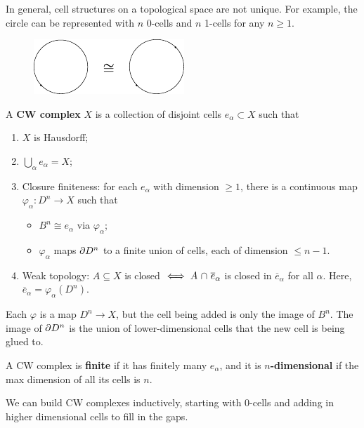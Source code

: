 \documentclass[twoside,10pt]{report}
\begin{document}
In general, cell structures on a topological space are not unique. For example, the circle can be represented with $n$ 0-cells and $n$ 1-cells for any $n \geq 1$.
\begin{figure}[H]
	\centering
	\includegraphics[scale=1.4]{fig/cell-not-unique.pdf}
\end{figure}

\begin{defn}[]
A \textbf{CW complex} $X$ is a collection of disjoint cells $e_{\alpha} \subset X$ such that
\begin{enumerate}
	\item $X$ is Hausdorff;
	\item $\bigcup_{\alpha}e_{\alpha}=X$;
	\item Closure finiteness: for each $e_{\alpha}$ with dimension $\geq 1$, there is a continuous map $\varphi_{\alpha}:D^{n}\to X$ such that
		\begin{itemize}
			\item $B^{n} \cong e_{\alpha}$ via $\varphi_{\alpha}$;
			\item $\varphi_{\alpha}$ maps $\partial D^{n}$ to a finite union of cells, each of dimension $\leq n-1$.
		\end{itemize}
	\item Weak topology: $A \subseteq X$ is closed $\iff A \operatorname{\,\cap\,} \overline{e}_{\alpha}$ is closed in $\overline{e}_{\alpha}$ for all $\alpha$. Here, $\overline{e}_{\alpha}=\varphi_{\alpha}(D^{n})$. 
\end{enumerate}
\end{defn}

\begin{note}[]
Each $\varphi$ is a map $D^{n}\to X$, but the cell being added is only the image of $B^{n}$. The image of $\partial D^{n}$ is the union of lower-dimensional cells that the new cell is being glued to.
\end{note}

A CW complex is \textbf{finite} if it has finitely many $e_{\alpha}$, and it is \textbf{$n$-dimensional} if the max dimension of all its cells is $n$.

We can build CW complexes inductively, starting with 0-cells and adding in higher dimensional cells to fill in the gaps.
\end{document}
